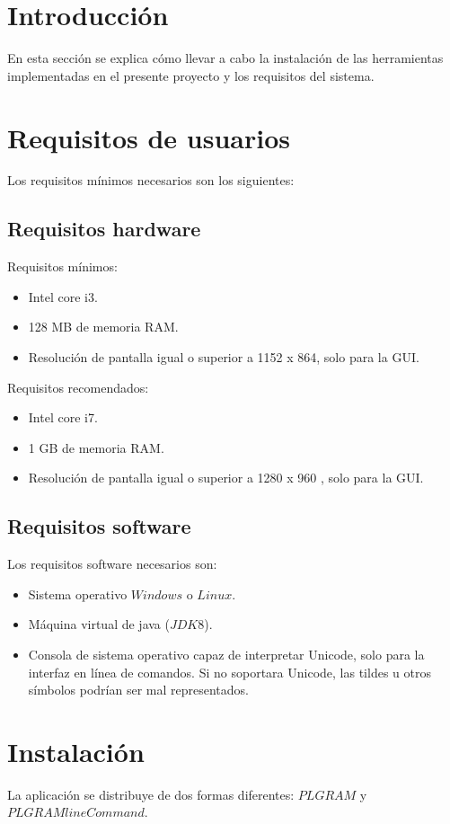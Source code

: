 
\section{Introducción}
En esta sección se explica cómo llevar a cabo la instalación de las herramientas implementadas en el presente proyecto y los requisitos del sistema.
\section{Requisitos de usuarios}
Los requisitos mínimos necesarios son los siguientes:
\subsection{Requisitos hardware}
Requisitos mínimos:
\begin{itemize}
\item Intel core i3.
\item 128 MB  de memoria RAM.
\item Resolución de pantalla igual o superior a 1152 x 864, solo para la GUI.
\end{itemize}

Requisitos recomendados:

\begin{itemize}

\item Intel core i7.
\item 1 GB de memoria RAM.
\item Resolución de pantalla igual o superior a 1280 x 960 , solo para la GUI.
\end{itemize}

\subsection{Requisitos software}

Los requisitos software necesarios son:
\begin{itemize}
\item Sistema operativo $Windows$ o $Linux$.
\item Máquina virtual de java ($JDK 8$).
\item Consola de sistema operativo capaz de interpretar Unicode, solo para la interfaz en línea de comandos. Si no soportara Unicode, las tildes u otros símbolos podrían ser mal representados.
\end{itemize}
\section{Instalación}
La aplicación se distribuye de dos formas diferentes: $PLGRAM$ y $PLGRAMlineCommand$.

